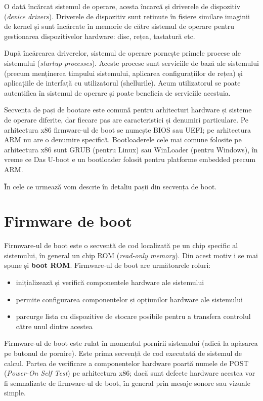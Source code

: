 O dată încărcat sistemul de operare, acesta încarcă și driverele de dispozitiv
(\textit{device drivers}). Driverele de dispozitiv sunt reținute în fișiere similare
imaginii de kernel și sunt încărcate în memorie de către sistemul de operare
pentru gestionarea dispozitivelor hardware: disc, rețea, tastatură etc.

După încărcarea driverelor, sistemul de operare pornește primele procese ale
sistemului (\textit{startup processes}). Aceste procese sunt serviciile de bază ale
sistemului (precum menținerea timpului sistemului, aplicarea configurațiilor de
rețea) și aplicațiile de interfață cu utilizatorul (shellurile). Acum
utilizatorul se poate autentifica în sistemul de operare și poate beneficia de
serviciile acestuia.

Secvența de pași de bootare este comună pentru arhitecturi hardware și sisteme
de operare diferite, dar fiecare pas are caracteristici și denumiri particulare.
Pe arhitectura x86 firmware-ul de boot se numește BIOS sau UEFI; pe arhitectura
ARM nu are o denumire specifică. Bootloaderele cele mai comune folosite pe arhitectura x86 sunt
GRUB (pentru Linux) sau WinLoader (pentru Windows), în vreme ce Das U-boot e un
bootloader folosit pentru platforme embedded precum ARM.

În cele ce urmează vom descrie în detaliu pașii din secvența de boot.

\section{Firmware de boot}
\label{sec:boot:firmware}

Firmware-ul de boot este o secvență de cod localizată pe un chip specific al
sistemului, în general un chip ROM (\textit{read-only memory}). Din acest motiv i se mai
spune și \textbf{boot ROM}. Firmware-ul de boot are următoarele roluri:

\begin{itemize}
	\item inițializează și verifică componentele hardware ale sistemului
	\item permite configurarea componentelor și opțiunilor hardware ale
		sistemului
	\item parcurge lista cu dispozitive de stocare posibile pentru a
		transfera controlul către unul dintre acestea
\end{itemize}

Firmware-ul de boot este rulat în momentul pornirii sistemului (adică la
apăsarea pe butonul de pornire). Este prima secvență de cod executată de
sistemul de calcul. Partea de verificare a componentelor hardware poartă numele
de POST  (\textit{Power-On Self Test}) pe arhitectura
x86; dacă sunt defecte hardware acestea vor fi semnalizate de firmware-ul de
boot, în general prin mesaje sonore sau vizuale simple.

